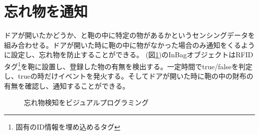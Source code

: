 \section{忘れ物を通知}
ドアが開いたかどうか、と鞄の中に特定の物があるかというセンシングデータを組み合わせる。ドアが開いた時に鞄の中に物がなかった場合のみ通知をくるように設定し、忘れ物を防止することができる。
(図\ref{fig:image12})のInBagオブジェクトはRFIDタグ\footnote{固有のID情報を埋め込めるタグ}を鞄に設置し、登録した物の有無を検出する。一定時間でtrue/falseを判定し、trueの時だけイベントを発火する。そしてドアが開いた時に鞄の中の財布の有無を確認し、通知することができる。
\begin{figure}[htbp]
  \begin{center}
  \end{center}
  \caption{忘れ物検知をビジュアルプログラミング}
  \label{fig:image12}
\end{figure}

